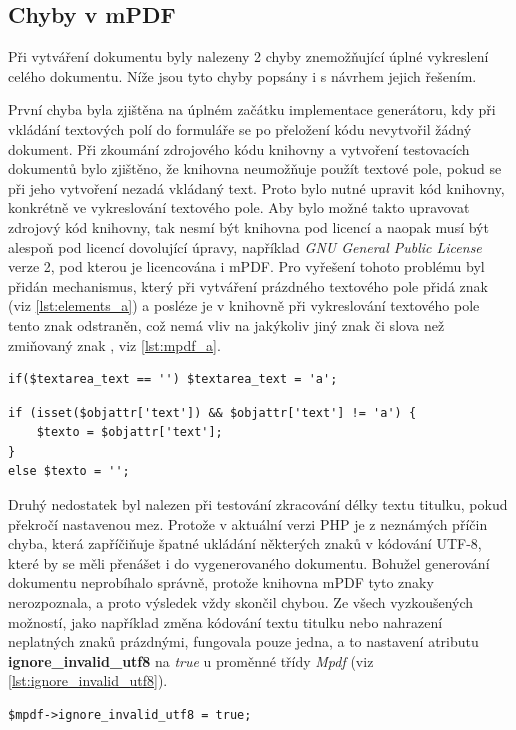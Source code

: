 \subsection{Chyby v mPDF}
Při vytváření dokumentu byly nalezeny 2 chyby znemožňující úplné vykreslení celého dokumentu. Níže jsou tyto chyby popsány i s návrhem jejich řešením.
\par
První chyba byla zjištěna na úplném začátku implementace generátoru, kdy při vkládání textových polí do formuláře se po přeložení kódu nevytvořil žádný dokument. Při zkoumání zdrojového kódu knihovny a vytvoření testovacích dokumentů bylo zjištěno, že knihovna neumožňuje použít textové pole, pokud se při jeho vytvoření nezadá vkládaný text. Proto bylo nutné upravit kód knihovny, konkrétně ve vykreslování textového pole. Aby bylo možné takto upravovat zdrojový kód knihovny, tak nesmí být knihovna pod licencí a naopak musí  být alespoň pod licencí dovolující úpravy, například \textit{GNU General Public License} verze 2, pod kterou je licencována i mPDF. Pro vyřešení tohoto problému byl přidán mechanismus, který při vytváření prázdného textového pole přidá znak  (viz \ref{lst:elements_a}) a posléze je v knihovně při vykreslování textového pole tento znak odstraněn, což nemá vliv na jakýkoliv jiný znak či slova než zmiňovaný znak , viz \ref{lst:mpdf_a}.
\begin{lstlisting}[caption = {Dočasné přiřazení znaku \uv{\textbf{a}} do textového pole (HTMLElements.php)}, label = {lst:elements_a}, captionpos=b]
if($textarea_text == '') $textarea_text = 'a';
\end{lstlisting}
\begin{lstlisting}[caption = {Odstranění znaku \uv{\textbf{a}} z textového pole (Mpdf.php)}, label = {lst:mpdf_a}, captionpos=b]
if (isset($objattr['text']) && $objattr['text'] != 'a') {
	$texto = $objattr['text'];
}
else $texto = '';
\end{lstlisting}
\par
Druhý nedostatek byl nalezen při testování zkracování délky textu titulku, pokud překročí nastavenou mez. Protože v aktuální verzi PHP je z neznámých příčin chyba, která zapříčiňuje špatné ukládání některých znaků v kódování UTF-8, které by se měli přenášet i do vygenerovaného dokumentu. Bohužel generování dokumentu neprobíhalo správně, protože knihovna mPDF tyto znaky nerozpoznala, a proto výsledek vždy skončil chybou. Ze všech vyzkoušených možností, jako například změna kódování textu titulku nebo nahrazení neplatných znaků prázdnými, fungovala pouze jedna, a to nastavení atributu \textbf{ignore\_invalid\_utf8} na \textit{true} u proměnné třídy \textit{Mpdf} (viz \ref{lst:ignore_invalid_utf8}).
\begin{lstlisting}[caption = {Nastavení atributu \textbf{ignore\_invalid\_utf8} (orlib.php)}, label = {lst:ignore_invalid_utf8}, captionpos=b]
$mpdf->ignore_invalid_utf8 = true;
\end{lstlisting}


